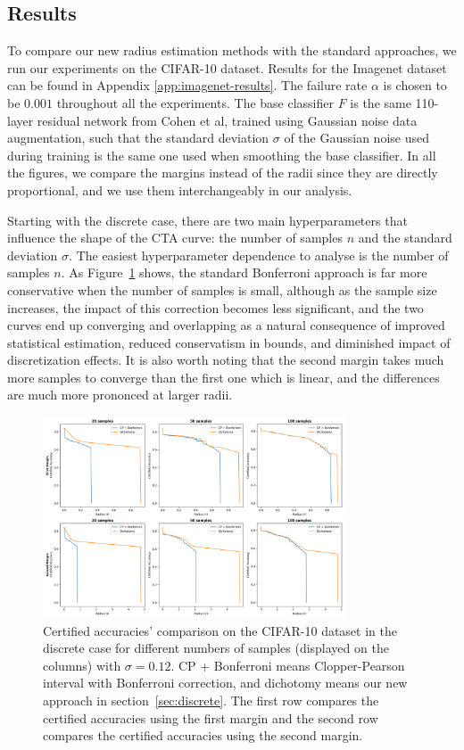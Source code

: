\subsection{Results}\label{subsec:results}

To compare our new radius estimation methods with the standard approaches, we run our experiments on the CIFAR-10 dataset.
Results for the Imagenet dataset can be found in Appendix \ref{app:imagenet-results}.
The failure rate $\alpha$ is chosen to be $0.001$ throughout all the experiments.
The base classifier $F$ is the same 110-layer residual network from Cohen et al, trained using Gaussian noise data augmentation, such that the standard deviation $\sigma$ of the Gaussian noise used during training is the same one used when smoothing the base classifier.
In all the figures, we compare the margins instead of the radii since they are directly proportional, and we use them interchangeably in our analysis.

Starting with the discrete case, there are two main hyperparameters that influence the shape of the CTA curve: the number of samples $n$ and the standard deviation $\sigma$.
The easiest hyperparameter dependence to analyse is the number of samples $n$.
As Figure~\ref{fig:discrete_num} shows, the standard Bonferroni approach is far more conservative when the number of samples is small, although as the sample size increases, the impact of this correction becomes less significant, and the two curves end up converging and overlapping as a natural consequence of improved statistical estimation, reduced conservatism in bounds, and diminished impact of discretization effects.
It is also worth noting that the second margin takes much more samples to converge than the first one which is linear, and the differences are much more prononced at larger radii.

\begin{figure}[htbp]
    \centering
    \includegraphics[width=0.8\textwidth]{images/discrete_num}
    \caption{Certified accuracies' comparison on the CIFAR-10 dataset in the discrete case for different numbers of samples (displayed on the columns) with $\sigma = 0.12$. CP + Bonferroni means Clopper-Pearson interval with Bonferroni correction, and dichotomy means our new approach in section~\ref{sec:discrete}. The first row compares the certified accuracies using the first margin and the second row compares the certified accuracies using the second margin.}
    \label{fig:discrete_num}
\end{figure}


